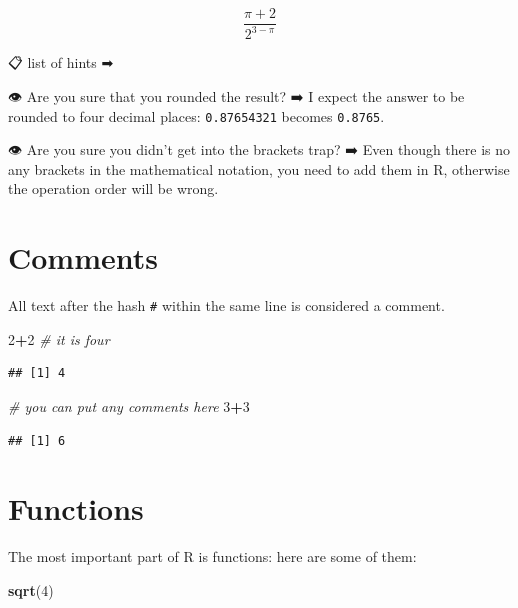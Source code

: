 \documentclass[
]{book}
\newenvironment{Shaded}{\begin{snugshade}}{\end{snugshade}}
\newcommand{\CommentTok}[1]{\textcolor[rgb]{0.56,0.35,0.01}{\textit{#1}}}
\newcommand{\DecValTok}[1]{\textcolor[rgb]{0.00,0.00,0.81}{#1}}
\newcommand{\KeywordTok}[1]{\textcolor[rgb]{0.13,0.29,0.53}{\textbf{#1}}}
\newcommand{\NormalTok}[1]{#1}
\newcommand{\OperatorTok}[1]{\textcolor[rgb]{0.81,0.36,0.00}{\textbf{#1}}}
\begin{document}
\[\frac{\pi+2}{2^{3-\pi}}\]

📋 list of hints ➡

👁 Are you sure that you rounded the result? ➡
I expect the answer to be rounded to four decimal places: \texttt{0.87654321} becomes \texttt{0.8765}.

👁 Are you sure you didn't get into the brackets trap? ➡
Even though there is no any brackets in the mathematical notation, you need to add them in R, otherwise the operation order will be wrong.

\hypertarget{comments}{%
\section{Comments}\label{comments}}

All text after the hash \texttt{\#} within the same line is considered a comment.

\begin{Shaded}
\begin{Highlighting}[]
\DecValTok{2}\OperatorTok{+}\DecValTok{2} \CommentTok{# it is four}
\end{Highlighting}
\end{Shaded}

\begin{verbatim}
## [1] 4
\end{verbatim}

\begin{Shaded}
\begin{Highlighting}[]
\CommentTok{# you can put any comments here}
\DecValTok{3}\OperatorTok{+}\DecValTok{3}
\end{Highlighting}
\end{Shaded}

\begin{verbatim}
## [1] 6
\end{verbatim}

\hypertarget{functions}{%
\section{Functions}\label{functions}}

The most important part of R is functions: here are some of them:

\begin{Shaded}
\begin{Highlighting}[]
\KeywordTok{sqrt}\NormalTok{(}\DecValTok{4}\NormalTok{)}
\end{Highlighting}
\end{Shaded}
\end{document}
